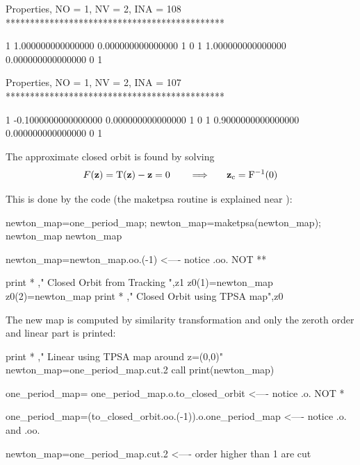 \documentclass[english,12pt,article]{article} %
\begin{document}
{{{\begin{example2}
 Properties, NO =    1, NV =    2, INA =  108
 *********************************************

   1   1.000000000000000       0.000000000000000       1  0
   1   1.000000000000000       0.000000000000000       0  1


 Properties, NO =    1, NV =    2, INA =  107
 *********************************************

   1 -0.1000000000000000       0.000000000000000       1  0
   1  0.9000000000000000       0.000000000000000       0  1
\end{example2}

The approximate closed orbit is found by solving 
%
\begin{align} F(\bf z\rm )=
T(\bf z\rm )-\bf z\rm =
0\ \ \ \ \ \ \Longrightarrow \ \ \ \ \  {\bf z}_{c}=
{F}^{-1}(0) \end{align}

This is done by the code (the maketpsa routine is explained near ):

\begin{code}
newton_map=one_period_map; newton_map=maketpsa(newton_map);
newton_map%
newton_map%


newton_map=newton_map.oo.(-1)    <---- notice .oo. NOT **

print * ," Closed Orbit from Tracking ",z1
z0(1)=newton_map%
z0(2)=newton_map%
 print * ," Closed Orbit using TPSA map",z0 
\end{code}

The new map is computed by similarity transformation and only the zeroth order and  linear part is printed:

\begin{example2}
 print * ," Linear using TPSA map around z=(0,0)"
newton_map=one_period_map.cut.2
call print(newton_map)

one_period_map= one_period_map.o.to_closed_orbit  <---- notice .o. NOT *

one_period_map=(to_closed_orbit.oo.(-1)).o.one_period_map  <---- notice .o. and .oo. 

newton_map=one_period_map.cut.2       <---- order higher than 1 are cut



\end{example2}}}}
\end{document}
